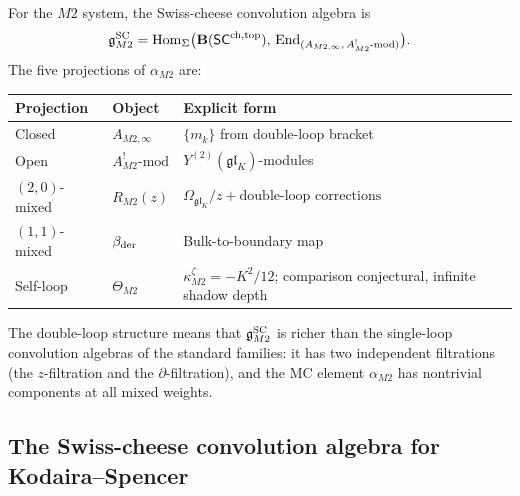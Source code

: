 \begin{computation}
For the $M2$ system, the Swiss-cheese convolution algebra is
\begin{equation}%
\gSC_{M2}
= \Hom_{\Sigma}\bigl(
\mathbf{B}(\SCop),\,
\End_{(A_{M2,\infty},\,A^!_{M2}\text{-mod})}
\bigr).
\end{equation}
The five projections of $\alpha_{M2}$ are:
\begin{center}
\renewcommand{\arraystretch}{1.25}
\begin{tabular}{lll}
\textbf{Projection} & \textbf{Object} & \textbf{Explicit form} \\
\hline
Closed & $A_{M2,\infty}$ &
$\{m_k\}$ from double-loop bracket \\
Open & $A^!_{M2}\text{-mod}$
& $Y^{(2)}(\mathfrak{gl}_K)$-modules \\
$(2,0)$-mixed & $R_{M2}(z)$
& $\Omega_{\mathfrak{gl}_K}/z + \text{double-loop corrections}$ \\
$(1,1)$-mixed & $\beta_{\mathrm{der}}$
& Bulk-to-boundary map \\
Self-loop & $\Theta_{M2}$
& $\kappa_{M2}^{\zeta}=-K^2/12$; comparison conjectural,
infinite shadow depth
\end{tabular}
\end{center}
The double-loop structure means that $\mathfrak{g}^{\mathrm{SC}}_{M2}$ is richer than
the single-loop convolution algebras of the standard families:
it has two independent filtrations (the $z$-filtration and the
$\partial$-filtration), and the MC element $\alpha_{M2}$ has
nontrivial components at all mixed weights.
\end{computation}


\subsection{The Swiss-cheese convolution algebra for Kodaira--Spencer}

